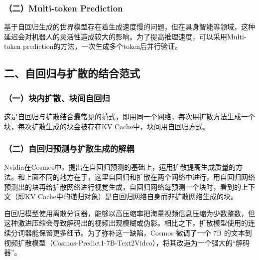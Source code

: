\hypertarget{ux4e8cmulti-token-prediction}{%
\subsubsection{（二）Multi-token Prediction}\label{ux4e8cmulti-token-prediction}}

基于自回归生成的世界模型存在着生成速度慢的问题，但在具身智能等领域，这种延迟会对机器人的灵活性造成较大的影响。为了提高推理速度，可以采用Multi-token prediction的方法，一次生成多个token后并行验证。

\hypertarget{ux4e8cux81eaux56deux5f52ux4e0eux6269ux6563ux7684ux7ed3ux5408ux8303ux5f0f}{%
\subsection{二、自回归与扩散的结合范式}\label{ux4e8cux81eaux56deux5f52ux4e0eux6269ux6563ux7684ux7ed3ux5408ux8303ux5f0f}}

\hypertarget{ux4e00ux5757ux5185ux6269ux6563ux5757ux95f4ux81eaux56deux5f52}{%
\subsubsection{（一）块内扩散、块间自回归}\label{ux4e00ux5757ux5185ux6269ux6563ux5757ux95f4ux81eaux56deux5f52}}

这是自回归与扩散结合最常见的范式，即用同一个网络，每次用扩散方法生成一个块，每次扩散生成的块会被存在KV Cache中，块间用自回归方式。

\hypertarget{ux4e8cux81eaux56deux5f52ux9884ux6d4bux4e0eux6269ux6563ux751fux6210ux7684ux89e3ux8026}{%
\subsubsection{（二）自回归预测与扩散生成的解耦}\label{ux4e8cux81eaux56deux5f52ux9884ux6d4bux4e0eux6269ux6563ux751fux6210ux7684ux89e3ux8026}}

Nvidia在Cosmos中，提出在自回归预测的基础上，运用扩散提高生成质量的方法。和上面不同的地方在于，这里自回归和扩散在两个网络中进行，用自回归网络预测出的块再给扩散网络进行视觉生成，自回归网络每预测一个块时，看到的上下文（即KV Cache中的递归对象）是自回归网络自身而非扩散网络生成的块。

自回归模型使用离散分词器，能够以高压缩率把海量视频信息压缩为少数整数，但这种激进压缩会导致解码出的视频出现模糊或伪影。相比之下，扩散模型使用的连续分词器能保留更多细节。为了弥补这一缺陷，Cosmos 微调了一个 7B 的文本到视频扩散模型（Cosmos-Predict1-7B-Text2Video），将其改造为一个强大的``解码器''。

